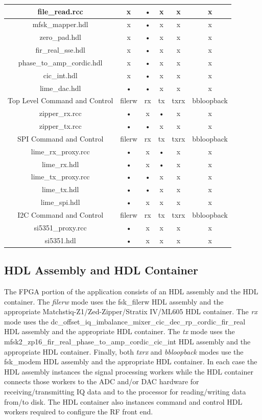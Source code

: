 \begin{tabular}{|c|c|c|c|c|c|}
	\hline
	file\_read.rcc & x & • & x & x & x \\
	\hline
	mfsk\_mapper.hdl & x & • & x & x & x \\
	\hline
	zero\_pad.hdl & x & • & x & x & x \\
	\hline
	fir\_real\_sse.hdl & x & • & x & x & x \\
	\hline
	phase\_to\_amp\_cordic.hdl & x & • & x & x & x \\
	\hline
	cic\_int.hdl & x & • & x & x & x \\
	\hline
	lime\_dac.hdl & • & • & x & x & x \\
	\hline
	\rowcolor{blue}
	Top Level Command and Control & filerw & rx & tx & txrx & bbloopback \\
	\hline
	zipper\_rx.rcc & • & x & • & x & x \\
	\hline
	zipper\_tx.rcc & • & • & x & x & x \\
	\hline
	\rowcolor{blue}
	SPI Command and Control & filerw & rx & tx & txrx & bbloopback \\
	\hline
	lime\_rx\_proxy.rcc & • & x & • & x & x \\
	\hline
	lime\_rx.hdl & • & x & • & x & x \\
	\hline
	lime\_tx\_proxy.rcc & • & • & x & x & x \\
	\hline
	lime\_tx.hdl & • & • & x & x & x \\
	\hline
	lime\_spi.hdl & • & x & x & x & x \\
	\hline
	\rowcolor{blue}
	I2C Command and Control & filerw & rx & tx & txrx & bbloopback \\
	\hline
	si5351\_proxy.rcc & • & x & x & x & x \\
	\hline
	si5351.hdl & • & x & x & x & x \\
	\hline
	\end{tabular}

	\newpage
\subsection{HDL Assembly and HDL Container}
\noindent The FPGA portion of the application consists of an HDL assembly and the HDL container. The \textit{filerw} mode uses the fsk\_filerw HDL assembly and the appropriate Matchstiq-Z1/Zed-Zipper/Stratix IV/ML605 HDL container. The \textit{rx} mode uses the dc\_offset\_iq\_imbalance\_mixer\_\-cic\_dec\_rp\_cordic\_fir\_real HDL assembly and the appropriate HDL container. The \textit{tx} mode uses the mfsk2\_zp16\_fir\_real\_phase\_to\_amp\_cordic\_cic\_int HDL assembly and the appropriate HDL container. Finally, both \textit{txrx} and \textit{bbloopback} modes use the fsk\_modem HDL assembly and the appropriate HDL container. In each case the HDL assembly instances the signal processing workers while the HDL container connects those workers to the ADC and/or DAC hardware for receiving/transmitting IQ data and to the processor for reading/writing data from/to disk. The HDL container also instances command and control HDL workers required to configure the RF front end.

